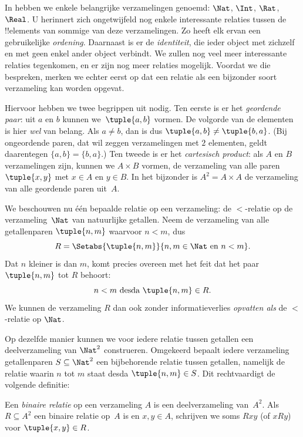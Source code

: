 \documentclass[../../../include/open-logic-section]{subfiles}
\begin{document}

\begin{explain}
In  hebben we enkele belangrijke
verzamelingen genoemd: $\Nat$, $\Int$, $\Rat$, $\Real$. U herinnert
zich ongetwijfeld nog enkele interessante relaties tussen de !!{element}s
van sommige van deze verzamelingen. Zo heeft elk ervan een gebruikelijke
\emph{ordening}. Daarnaast is er de \emph{identiteit}, die ieder object
met zichzelf en met geen enkel ander object verbindt. We zullen nog veel meer
interessante relaties tegenkomen, en er zijn nog meer relaties mogelijk.
Voordat we die bespreken, merken we echter eerst op dat een relatie als een
bijzonder soort verzameling kan worden opgevat.
  
Hiervoor hebben we twee begrippen uit  nodig.
Ten eerste is er het \emph{geordende paar}: uit $a$ en $b$ kunnen
we~$\tuple{a, b}$ vormen. De volgorde van de elementen is hier
\emph{wel} van belang. Als $a \neq b$, dan is dus $\tuple{a, b} \neq
\tuple{b, a}$. (Bij ongeordende paren, dat wil zeggen verzamelingen met
$2$ elementen, geldt daarentegen $\{a, b\}=\{b, a\}$.) Ten tweede is er het
\emph{cartesisch product}: als $A$ en $B$ verzamelingen zijn, kunnen we
$A \times B$ vormen, de verzameling van alle paren $\tuple{x, y}$ met
$x \in A$ en $y \in B$. In het bijzonder is $A^{2}= A \times A$ de
verzameling van alle geordende paren uit~$A$.
  
We beschouwen nu één bepaalde relatie op een verzameling: de
$<$-relatie op de verzameling~$\Nat$ van natuurlijke getallen. Neem de
verzameling van alle getallenparen $\tuple{n, m}$ waarvoor $n<m$, dus
\[
  R=\Setabs{\tuple{n, m}}{n, m \in \Nat \text{ en } n<m}.
\]
Dat $n$ kleiner is dan $m$, komt precies overeen met het feit dat het
paar $\tuple{n, m}$ tot $R$ behoort:
\[
      n<m\text{ desda }\tuple{n, m} \in R.
\]
We kunnen de verzameling $R$ dan ook zonder informatieverlies
\emph{opvatten als} de $<$-relatie op $\Nat$.

Op dezelfde manier kunnen we voor iedere relatie tussen getallen een
deelverzameling van $\Nat^{2}$ construeren. Omgekeerd bepaalt iedere
verzameling getallenparen $S \subseteq \Nat^{2}$ een bijbehorende
relatie tussen getallen, namelijk de relatie waarin $n$ tot $m$ staat
desda $\tuple{n, m} \in S$. Dit rechtvaardigt de volgende definitie:
\end{explain}
  
\begin{defn}
Een \emph{binaire relatie} op een verzameling $A$ is een
deelverzameling van~$A^{2}$. Als $R \subseteq A^{2}$ een binaire
relatie op~$A$ is en $x, y \in A$, schrijven we soms $Rxy$ (of $xRy$)
voor $\tuple{x, y} \in R$.
\end{defn}
  
\end{document}
